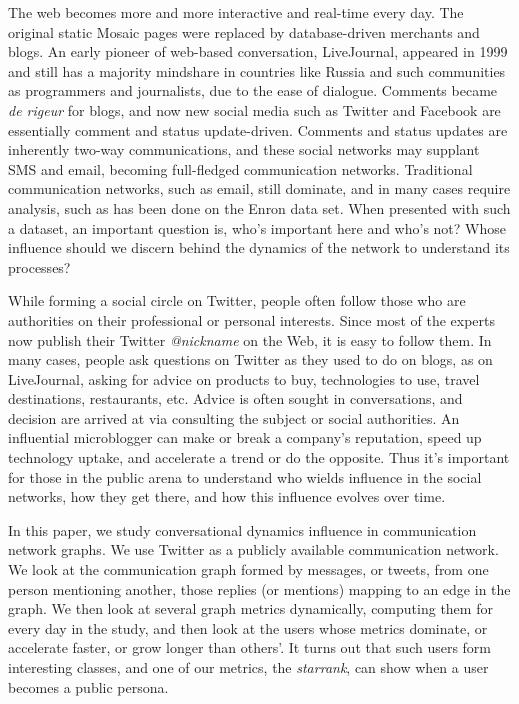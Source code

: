 \documentclass[10pt,oneside]{memoir}
\begin{document}
\label{chapter:Influence}


The web becomes more and more interactive and real-time every day.  The original static Mosaic pages were replaced by database-driven merchants and blogs.  An early pioneer of web-based conversation, LiveJournal, appeared in 1999 and still has a majority mindshare in countries like Russia and such communities as programmers and journalists, due to the ease of dialogue.  Comments became {\itshape de rigeur} for  blogs, and now new social media such as Twitter and Facebook are essentially comment and status update-driven.  Comments and status updates are inherently two-way communications, and these social networks may supplant SMS and email, becoming full-fledged communication networks.  Traditional communication networks, such as email, still dominate, and in many cases require analysis, such as has been done on the Enron data set.  When presented with such a dataset, an important question is, who's important here and who's not?  Whose influence should we discern behind the dynamics of the network to understand its processes?


While forming a social circle on Twitter, people often follow those who are authorities on their professional or personal interests.  Since most of the experts now publish their Twitter {\itshape @nickname} on the Web, it is easy to follow them.  In many cases, people ask questions on Twitter as they used to do on blogs, as on LiveJournal, asking for advice on products to buy, technologies to use, travel destinations, restaurants, etc.  Advice is often sought in conversations, and decision are arrived at via consulting the subject or social authorities.  An influential microblogger can make or break a company's reputation, speed up technology uptake, and accelerate a trend or do the opposite.  Thus it's important for those in the public arena to understand who wields influence in the social networks, how they get there, and how this influence evolves over time.


In this paper, we study conversational dynamics influence in communication network graphs.  We use Twitter as a publicly available communication network.  We look at the communication graph formed by messages, or tweets, from one person mentioning another, those replies (or mentions) mapping to an edge in the graph.  We then look at several graph metrics dynamically, computing them for every day in the study, and then look at the users whose metrics dominate, or accelerate faster, or grow longer than others'.  It turns out that such users form interesting classes, and one of our metrics, the {\itshape starrank}, can show when a user becomes a public persona.
\end{document}
